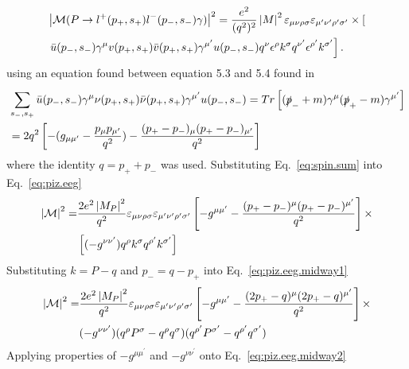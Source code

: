 \begin{align}\label{eq:piz.eeg}
&\left|{\cal M}(P\to l^+(p_+,s_+)l^-(p_-,s_-) \gamma)\right|^2 =  \frac{e^2}{(q^2)^2} \left|M\right|^2  \varepsilon_{\mu\nu\rho\sigma}\varepsilon_{\mu^{\prime}\nu^{\prime}\rho^{\prime}\sigma^{\prime}}   \nonumber \times \left[\right.
\\ & \left.\bar u(p_-,s_-) \gamma^\mu v(p_+,s_+) \bar v(p_+,s_+) \gamma^{\mu^{\prime}}  u(p_-,s_-) q^\nu \epsilon^\rho k^\sigma q^{\nu^{\prime}} \epsilon^{\rho^{\prime}} k^{\sigma^{\prime}}\right] .
%
\end{align}
using an equation found between equation 5.3 and 5.4 found in~\cite{peskin}
\begin{align}\label{eq:spin.sum}
& \sum\limits_{s_{-},s_{+}}^{} \bar{u}(p_{-},s_{-})\gamma^{\mu}\nu(p_{+},s_{+})\bar{\nu}(p_{+},s_{+})\gamma^{\mu^{\prime}}u(p_{-},s_{-}) = Tr\left[ (\slashed{p}_- +m)\gamma^{\mu} (\slashed{p}_+-m)\gamma^{\mu^{\prime}} \right]\nonumber \\ & =2q^{2}\left[-(g_{\mu\mu^{\prime}}-\frac{p_{\mu}p_{\mu^{\prime}}}{q^{2}} ) - \frac{(p_{+} - p_{-})_{\mu}(p_{+} - p_{-})_{\mu^{\prime}}}{q^{2}}\right]
\end{align}
where the identity $q = p_+ + p_-$ was used.
Substituting Eq.~\ref{eq:spin.sum} into Eq.~\ref{eq:piz.eeg}
\begin{align} \label{eq:piz.eeg.midway1}
\left|{\cal M}\right|^{2} = &  \frac{2e^{2}\left|M_{P}\right|^{2}}{q^{2}}\varepsilon_{\mu\nu\rho\sigma}\varepsilon_{\mu^{\prime}\nu^{\prime}\rho^{\prime}\sigma^{\prime}}\left[-g^{\mu\mu^{\prime}} - \frac{(p_{+} - p_{-})^{\mu}(p_{+} - p_{-})^{\mu^{\prime}}}{q^{2}}\right]
\times \nonumber \\ &\left[ (-g^{\nu\nu^{\prime}})q^{\rho}k^{\sigma}q^{\rho^{\prime}}k^{\sigma^{\prime}} \right]
\end{align}
Substituting $k = P - q$ and $p_- = q - p_+$ into Eq.~\ref{eq:piz.eeg.midway1}
\begin{align} \label{eq:piz.eeg.midway2}
\left|{\cal M}\right|^{2} = & \frac{2e^{2}\left|M_{P}\right|^{2}}{q^{2}}\varepsilon_{\mu\nu\rho\sigma}\varepsilon_{\mu^{\prime}\nu^{\prime}\rho^{\prime}\sigma^{\prime}}\left[-g^{\mu\mu^{\prime}} - \frac{(2p_{+} - q)^{\mu}(2p_{+} - q)^{\mu^{\prime}}}{q^{2}}\right] \times \nonumber \\ &  (-g^{\nu\nu^{\prime}})      
(q^{\rho}P^{\sigma} - q^{\rho}q^{\sigma}) (q^{\rho^{\prime}}P^{\sigma^{\prime}} - q^{\rho^{\prime}}q^{\sigma^{\prime}})
\end{align}
Applying properties of $-g^{\mu\mu^{\prime}}$ and $-g^{\nu\nu^{\prime}}$ onto Eq.~\ref{eq:piz.eeg.midway2}
